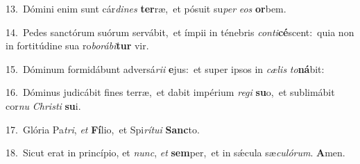 {\numbfont\textcolor{\numbcolor}{13.}}~Dómini enim sunt cár\-\textit{di}\-\textit{nes} \textbf{ter}\-ræ,~\star et pósuit su\textit{per} \textit{e}\-\textit{os} \textbf{or}\-bem.\par
{\numbfont\textcolor{\numbcolor}{14.}}~Pedes sanctórum suórum servábit,~\dagger et ímpii in ténebris \textit{con}\-\textit{ti}\textbf{cé}scent:~\star quia non in fortitúdine sua ro\-\textit{bo}\-\textit{rá}\textit{bi}\textbf{tur} vir.\par
{\numbfont\textcolor{\numbcolor}{15.}}~Dóminum formidábunt adversá\-\textit{ri}\-\textit{i} \textbf{e}\-jus:~\star et super ipsos in \textit{cæ}\-\textit{lis} \textit{to}\-\textbf{ná}bit:\par
{\numbfont\textcolor{\numbcolor}{16.}}~Dóminus judicábit fines terræ,~\dagger et dabit impérium \textit{re}\-\textit{gi} \textbf{su}\-o,~\star et sublimábit cor\textit{nu} \textit{Chris}\-\textit{ti} \textbf{su}\-i.\par
{\numbfont\textcolor{\numbcolor}{17.}}~Glória Pa\-\textit{tri}\-, \textit{et} \textbf{Fí}\-lio,~\star et Spi\-\textit{rí}\-\textit{tu}\textit{i} \textbf{Sanc}\-to.\par
{\numbfont\textcolor{\numbcolor}{18.}}~Sicut erat in princípio, et \textit{nunc}\-, \textit{et} \textbf{sem}\-per,~\star et in sǽcula sæ\-\textit{cu}\-\textit{ló}\textit{rum}. \textbf{A}\-men.\par
